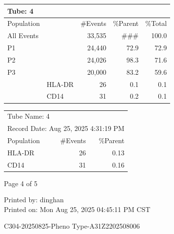 \documentclass[UTF8,10pt,a4paper,fontset=fandol]{ctexart}
\begin{document}
\begin{center}
\begin{tabular}{|p{1.9cm}|p{1.8cm}|r|r|r|}
\hline
\multicolumn{5}{|l|}{Tube: \textbf{4}}\\
\hline
Population & & \#Events & \%Parent & \%Total\\
\hline
All Events & & 33,535 & \#\#\# & 100.0\\
P1 & & 24,440 & 72.9 & 72.9\\
P2 & & 24,026 & 98.3 & 71.6\\
P3 & & 20,000 & 83.2 & 59.6\\
& HLA-DR & 26 & 0.1 & 0.1\\
& CD14 & 31 & 0.2 & 0.1\\
\hline
\end{tabular}
\end{center}

\vspace{0.5em}

\begin{center}
\begin{tabular}{|p{4.0cm}|r|r|}
\hline
\multicolumn{3}{|l|}{Tube Name: \hfill 4}\\
\multicolumn{3}{|l|}{Record Date: \hfill Aug 25, 2025 4:31:19 PM}\\
\hline
Population & \#Events & \%Parent\\
\hline
HLA-DR & 26 & 0.13\\
CD14 & 31 & 0.16\\
\hline
\end{tabular}
\end{center}

\vfill

\begin{center}
Page 4 of 5
\end{center}

\begin{flushright}
Printed by: dinghan\\
Printed on: Mon Aug 25, 2025 04:45:11 PM CST
\end{flushright}

\newpage

\begin{center}
C304-20250825-Pheno Type-A31Z2202508006
\end{center}
\end{document}
